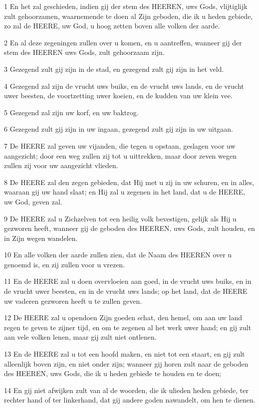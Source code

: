 \par 1 En het zal geschieden, indien gij der stem des HEEREN, uws Gods, vlijtiglijk zult gehoorzamen, waarnemende te doen al Zijn geboden, die ik u heden gebiede, zo zal de HEERE, uw God, u hoog zetten boven alle volken der aarde.
\par 2 En al deze zegeningen zullen over u komen, en u aantreffen, wanneer gij der stem des HEEREN uws Gods, zult gehoorzaam zijn.
\par 3 Gezegend zult gij zijn in de stad, en gezegend zult gij zijn in het veld.
\par 4 Gezegend zal zijn de vrucht uws buiks, en de vrucht uws lands, en de vrucht uwer beesten, de voortzetting uwer koeien, en de kudden van uw klein vee.
\par 5 Gezegend zal zijn uw korf, en uw baktrog.
\par 6 Gezegend zult gij zijn in uw ingaan, gezegend zult gij zijn in uw uitgaan.
\par 7 De HEERE zal geven uw vijanden, die tegen u opstaan, geslagen voor uw aangezicht; door een weg zullen zij tot u uittrekken, maar door zeven wegen zullen zij voor uw aangezicht vlieden.
\par 8 De HEERE zal den zegen gebieden, dat Hij met u zij in uw schuren, en in alles, waaraan gij uw hand slaat; en Hij zal u zegenen in het land, dat u de HEERE, uw God, geven zal.
\par 9 De HEERE zal u Zichzelven tot een heilig volk bevestigen, gelijk als Hij u gezworen heeft, wanneer gij de geboden des HEEREN, uws Gods, zult houden, en in Zijn wegen wandelen.
\par 10 En alle volken der aarde zullen zien, dat de Naam des HEEREN over u genoemd is, en zij zullen voor u vrezen.
\par 11 En de HEERE zal u doen overvloeien aan goed, in de vrucht uws buiks, en in de vrucht uwer beesten, en in de vrucht uws lands; op het land, dat de HEERE uw vaderen gezworen heeft u te zullen geven.
\par 12 De HEERE zal u opendoen Zijn goeden schat, den hemel, om aan uw land regen te geven te zijner tijd, en om te zegenen al het werk uwer hand; en gij zult aan vele volken lenen, maar gij zult niet ontlenen.
\par 13 En de HEERE zal u tot een hoofd maken, en niet tot een staart, en gij zult alleenlijk boven zijn, en niet onder zijn; wanneer gij horen zult naar de geboden des HEEREN, uws Gods, die ik u heden gebiede te houden en te doen;
\par 14 En gij niet afwijken zult van al de woorden, die ik ulieden heden gebiede, ter rechter hand of ter linkerhand, dat gij andere goden nawandelt, om hen te dienen.

